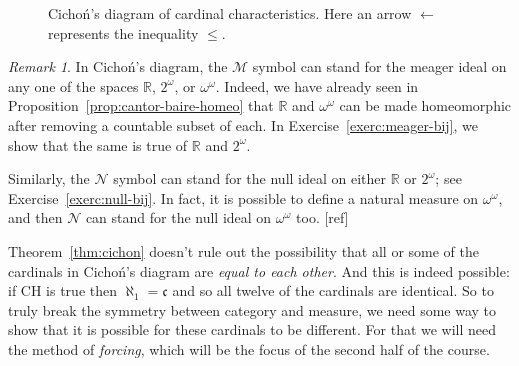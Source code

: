 \documentclass[11pt,oneside]{amsbook}
\newcommand{\R}{\mathbb R}
\newcommand{\Null}{\mathcal N}
\newcommand{\Meager}{\mathcal M}
\DeclareMathOperator{\add}{\mathsf{add}}
\DeclareMathOperator{\non}{\mathsf{non}}
\DeclareMathOperator{\cov}{\mathsf{cov}}
\DeclareMathOperator{\cof}{\mathsf{cof}}
\theoremstyle{definition}
\theoremstyle{plain}
\theoremstyle{definition}
\theoremstyle{remark}
\newtheorem{remark}[theorem]{Remark}
\numberwithin{equation}{section}
\numberwithin{figure}{section}
\begin{document}
\begin{figure}[h]
  \caption{Cicho\'n's diagram of cardinal characteristics. Here an arrow $\leftarrow$ represents the inequality $\leq$.\label{fig:cichon}}
\end{figure}

\begin{remark}
  In Cicho\'n's diagram, the $\Meager$ symbol can stand for the meager ideal on any one of the spaces $\R$, $2^\omega$, or $\omega^\omega$. Indeed, we have already seen in Proposition~\ref{prop:cantor-baire-homeo} that $\R$ and $\omega^\omega$ can be made homeomorphic after removing a countable subset of each. In Exercise~\ref{exerc:meager-bij}, we show that the same is true of $\R$ and $2^\omega$.
  
  Similarly, the $\Null$ symbol can stand for the null ideal on either $\R$ or $2^\omega$; see Exercise~\ref{exerc:null-bij}. In fact, it is possible to define a natural measure on $\omega^\omega$, and then $\Null$ can stand for the null ideal on $\omega^\omega$ too.
  [ref] %
\end{remark}

Theorem~\ref{thm:cichon} doesn't rule out the possibility that all or some of the cardinals in Cicho\'n's diagram are \emph{equal to each other}. And this is indeed possible: if CH is true then $\aleph_1=\mathfrak c$ and so all twelve of the cardinals are identical. So to truly break the symmetry between category and measure, we need some way to show that it is possible for these cardinals to be different. For that we will need the method of \emph{forcing}, which will be the focus of the second half of the course.
\end{document}
